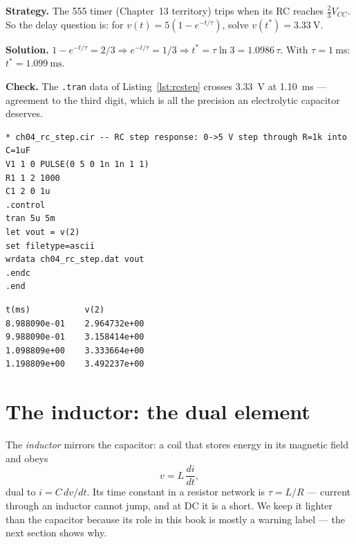 \begin{example}
\label{ex:delay555}
\textbf{Strategy.} The 555 timer (Chapter~13 territory) trips when its RC
reaches $\tfrac23 V_{CC}$. So the delay question is: for $v(t)=5(1-e^{-t/\tau})$,
solve $v(t^*)=\qty{3.33}{\volt}$.

\textbf{Solution.} $1-e^{-t/\tau}=2/3 \Rightarrow e^{-t/\tau}=1/3
\Rightarrow t^*=\tau\ln 3=1.0986\,\tau$. With $\tau=\qty{1}{\milli\second}$:
$t^*=\qty{1.099}{\milli\second}$.

\textbf{Check.} The \texttt{.tran} data of Listing~\ref{lst:rcstep} crosses
\qty{3.33}{\volt} at \qty{1.10}{\milli\second} — agreement to the third
digit, which is all the precision an electrolytic capacitor deserves.
\end{example}

\begin{lstlisting}[language={},caption={\texttt{code/ch04\_rc\_step.cir} — the step that produces Figures~\ref{fig:rcstep}--\ref{fig:tau} (simulation S1). The discharge twin \texttt{code/ch04\_rc\_discharge.cir} is the same file with the source removed and \texttt{.ic v(2)=5}.},label=lst:rcstep]
* ch04_rc_step.cir -- RC step response: 0->5 V step through R=1k into C=1uF
V1 1 0 PULSE(0 5 0 1n 1n 1 1)
R1 1 2 1000
C1 2 0 1u
.control
tran 5u 5m
let vout = v(2)
set filetype=ascii
wrdata ch04_rc_step.dat vout
.endc
.end
\end{lstlisting}

\begin{lstlisting}[language={},caption={Actual rows of \texttt{ch04\_rc\_step\_ms.dat} (the ms-rescaled file of Figure~\ref{fig:tau}; ngspice's adaptive steps land on these timestamps, not round numbers) — \qty{3.158}{\volt} at \qty{0.999}{\milli\second} is the 63\% mark, and \qty{3.334}{\volt} at \qty{1.099}{\milli\second} is the $\tau\ln 3$ crossing of Example~\ref{ex:delay555}.},label=lst:rcdata]
t(ms)           v(2)
8.988090e-01    2.964732e+00
9.988090e-01    3.158414e+00
1.098809e+00    3.333664e+00
1.198809e+00    3.492237e+00
\end{lstlisting}

\section{The inductor: the dual element}
\label{sec:ind}

The \emph{inductor} mirrors the capacitor: a coil that stores
energy in its magnetic field and obeys
\[
v = L\,\frac{di}{dt},
\]
dual to $i=C\,dv/dt$. Its time constant in a resistor
network is $\tau=L/R$ — current through an inductor
cannot jump, and at DC it is a short. We keep it lighter than the capacitor
because its role in this book is mostly a warning label — the next section
shows why.

